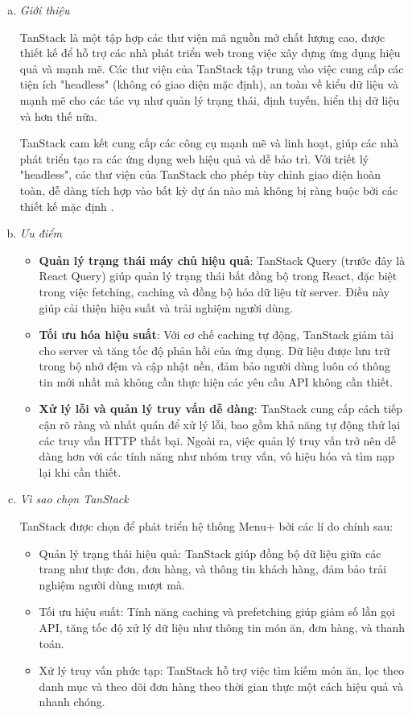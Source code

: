 \begin{enumerate}[(a)]
	\item \textit{Giới thiệu}

	      TanStack là một tập hợp các thư viện mã nguồn mở chất lượng cao, được thiết kế để hỗ trợ các nhà phát triển web trong việc xây dựng ứng dụng hiệu quả và mạnh mẽ. Các thư viện của TanStack tập trung vào việc cung cấp các tiện ích "headless" (không có giao diện mặc định), an toàn về kiểu dữ liệu và mạnh mẽ cho các tác vụ như quản lý trạng thái, định tuyến, hiển thị dữ liệu và hơn thế nữa.

	      TanStack cam kết cung cấp các công cụ mạnh mẽ và linh hoạt, giúp các nhà phát triển tạo ra các ứng dụng web hiệu quả và dễ bảo trì. Với triết lý "headless", các thư viện của TanStack cho phép tùy chỉnh giao diện hoàn toàn, dễ dàng tích hợp vào bất kỳ dự án nào mà không bị ràng buộc bởi các thiết kế mặc định \cite{TanStack}.

	\item \textit{Ưu điểm}

	      \begin{itemize}
		      \item \textbf{Quản lý trạng thái máy chủ hiệu quả}: TanStack Query (trước đây là React Query) giúp quản lý trạng thái bất đồng bộ trong React, đặc biệt trong việc fetching, caching và đồng bộ hóa dữ liệu từ server. Điều này giúp cải thiện hiệu suất và trải nghiệm người dùng.
		      \item \textbf{Tối ưu hóa hiệu suất}: Với cơ chế caching tự động, TanStack giảm tải cho server và tăng tốc độ phản hồi của ứng dụng. Dữ liệu được lưu trữ trong bộ nhớ đệm và cập nhật nền, đảm bảo người dùng luôn có thông tin mới nhất mà không cần thực hiện các yêu cầu API không cần thiết.
		      \item \textbf{Xử lý lỗi và quản lý truy vấn dễ dàng}: TanStack cung cấp cách tiếp cận rõ ràng và nhất quán để xử lý lỗi, bao gồm khả năng tự động thử lại các truy vấn HTTP thất bại. Ngoài ra, việc quản lý truy vấn trở nên dễ dàng hơn với các tính năng như nhóm truy vấn, vô hiệu hóa và tìm nạp lại khi cần thiết.
	      \end{itemize}

	\item \textit{Vì sao chọn TanStack}

	      TanStack được chọn để phát triển hệ thống Menu+ bởi các lí do chính sau:
	      \begin{itemize}
		      \item Quản lý trạng thái hiệu quả: TanStack giúp đồng bộ dữ liệu giữa các trang như thực đơn, đơn hàng, và thông tin khách hàng, đảm bảo trải nghiệm người dùng mượt mà.
		      \item Tối ưu hiệu suất: Tính năng caching và prefetching giúp giảm số lần gọi API, tăng tốc độ xử lý dữ liệu như thông tin món ăn, đơn hàng, và thanh toán.
		      \item Xử lý truy vấn phức tạp: TanStack hỗ trợ việc tìm kiếm món ăn, lọc theo danh mục và theo dõi đơn hàng theo thời gian thực một cách hiệu quả và nhanh chóng.
	      \end{itemize}


\end{enumerate}
